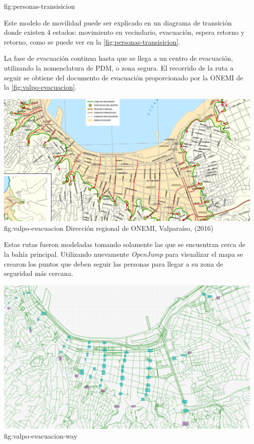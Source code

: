 {}{fig:personas-transisicion}

Este modelo de movilidad puede ser explicado en un diagrama de transición donde
existen 4 estados: movimiento en vecindario, evacuación, espera retorno y
retorno, como se puede ver en la \ref{fig:personas-transisicion}.

La fase de evacuación continua hasta que se llega a un centro de evacuación,
utilizando la nomenclatura de PDM, o zona segura. El recorrido de la ruta a
seguir se obtiene del documento de evacuación proporcionado por la ONEMI de la
\ref{fig:valpo-evacuacion}.


{\includegraphics[scale=0.4]{imagenes/valpo/evacuacion.png}}{fig:valpo-evacuacion}
{Dirección regional de ONEMI, Valparaíso, (2016)}

Estas rutas fueron modeladas tomando solamente las que se encuentran cerca de la
bahía principal. Utilizando nuevamente \textit{OpenJump} para visualizar el mapa
se crearon los puntos que deben seguir las personas para llegar a su zona de
seguridad más cercana.


{\includegraphics[scale=0.4]{imagenes/valpo/waypoints.png}}{fig:valpo-evacuacion-way}



